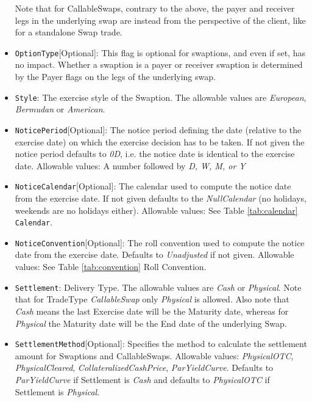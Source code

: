 \begin{itemize}
Note that for CallableSwaps, contrary to the above, the payer and receiver legs in the underlying swap are instead from the perspective of the client, like for a standalone Swap trade.



\item \lstinline!OptionType![Optional]: This flag is optional for swaptions, and even if set, has no impact. Whether a swaption is a payer or receiver swaption is determined by the Payer flags on the legs of the underlying swap.

\item  \lstinline!Style!: The exercise style of the Swaption. The allowable values are \emph{European},  \emph{Bermudan} or  \emph{American}. 

\item \lstinline!NoticePeriod![Optional]: The notice period defining the date (relative to the exercise date) on which the exercise
  decision has to be taken. If not given the notice period defaults to \emph{0D}, i.e. the notice date is identical to the
  exercise date. Allowable values: A number followed by \emph{D, W, M, or Y}

\item \lstinline!NoticeCalendar![Optional]: The calendar used to compute the notice date from the exercise date. If not given
  defaults to the \emph{NullCalendar} (no holidays, weekends are no holidays either). Allowable values: See Table \ref{tab:calendar} \lstinline!Calendar!.

\item \lstinline!NoticeConvention![Optional]: The roll convention used to compute the notice date from the exercise date. Defaults to
  \emph{Unadjusted} if not given. Allowable values: See Table \ref{tab:convention} Roll Convention.

\item  \lstinline!Settlement!: Delivery Type. The allowable values are \emph{Cash} or \emph{Physical}. Note that for TradeType \emph{CallableSwap} only \emph{Physical} is allowed. Also note that \emph{Cash} means the last Exercise date will be the Maturity date, whereas for \emph{Physical} the Maturity date will be the End date of the underlying Swap.

\item \lstinline!SettlementMethod![Optional]: Specifies the method to calculate the settlement amount for Swaptions and CallableSwaps. Allowable values: \emph{PhysicalOTC}, \emph{PhysicalCleared}, \emph{CollateralizedCashPrice}, \emph{ParYieldCurve}. Defaults to \emph{ParYieldCurve} if Settlement is \emph{Cash} and defaults to \emph{PhysicalOTC} if Settlement is \emph{Physical}.


\end{itemize}

